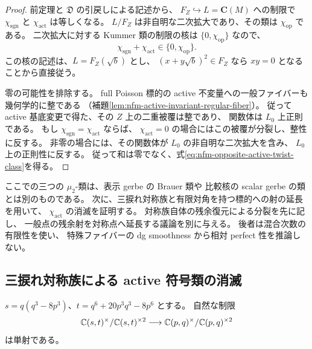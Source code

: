 \begin{proof}
前定理と $\mathfrak D$ の引戻しによる記述から、
$F_Z\hookrightarrow L=\mathbf C(M)$ への制限で
$\chi_{\mathrm{sgn}}$ と $\chi_{\mathrm{act}}$ は等しくなる。
$L/F_Z$ は非自明な二次拡大であり、その類は $\chi_{\mathrm{op}}$ である。
二次拡大に対する Kummer 類の制限の核は
$\{0,\chi_{\mathrm{op}}\}$ なので、
\[
 \chi_{\mathrm{sgn}}+\chi_{\mathrm{act}}
       \in\{0,\chi_{\mathrm{op}}\}.
\]
この核の記述は、$L=F_Z(\sqrt b)$ とし、
$(x+y\sqrt b)^2\in F_Z$ なら $xy=0$ となることから直接従う。

零の可能性を排除する。
full Poisson 標的の active 不変量への一般ファイバーも幾何学的に整である
（補題\ref{lem:nfm-active-invariant-regular-fiber}）。
従って active 基底変更で得た、その $Z$ 上の二重被覆は整であり、
関数体は $L_0$ 上正則である。
もし $\chi_{\mathrm{sgn}}=\chi_{\mathrm{act}}$ ならば、
$\chi_{\mathrm{act}}=0$ の場合にはこの被覆が分裂し、整性に反する。
非零の場合には、その関数体が $L_0$ の非自明な二次拡大を含み、
$L_0$ 上の正則性に反する。
従って和は零でなく、式\eqref{eq:nfm-opposite-active-twist-class}を得る。
\end{proof}

ここでの三つの $\mu_2$-類は、表示 gerbe の Brauer 類や
比較核の scalar gerbe の類とは別のものである。
次に、三捩れ対称族と有限対角を持つ標的への射の延長を用いて、
$\chi_{\mathrm{act}}$ の消滅を証明する。
対称族自体の残余復元による分裂を先に記し、
一般点の残余射を対称点へ延長する議論を別に与える。
後者は混合次数の有限性を使い、
特殊ファイバーの dg smoothness から相対 perfect 性を推論しない。

\subsection{三捩れ対称族による active 符号類の消滅}

\begin{lemma}
\label{lem:nfm-hesse-kummer-injective}
$s=q(q^3-8p^3)$、$t=q^6+20p^3q^3-8p^6$ とする。
自然な制限
\[
 \mathbb C(s,t)^\times/\mathbb C(s,t)^{\times2}
 \longrightarrow
 \mathbb C(p,q)^\times/\mathbb C(p,q)^{\times2}
\]
は単射である。
\end{lemma}

